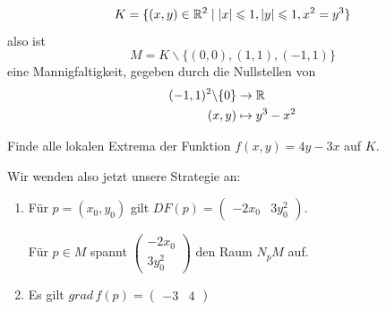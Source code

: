 \documentclass[main.tex]{subfiles}
\begin{document}
\begin{Beispiel}
  $$K = \{(x,y) \in \mathbb{R}^2 \mid |x| \leqslant 1, |y| \leqslant 1, x^2 = y^3\}$$
  also ist
  $$M = K \backslash \{(0,0), (1,1), (-1,1)\}$$ eine Mannigfaltigkeit, gegeben durch die Nullstellen von
  $$\begin{aligned}
    (-1,1)^2 \backslash \{0\} & \to \mathbb{R} \\
    (x,y) & \mapsto y^3 - x^2
  \end{aligned}$$

  \begin{center}
  \end{center}

  Finde alle lokalen Extrema der Funktion $f(x,y) = 4y - 3x$ auf $K$.

  Wir wenden also jetzt unsere Strategie an:
  \begin{enumerate}
    \item Für $p = (x_0,y_0)$ gilt $DF(p) = \begin{pmatrix}
        -2x_0 & 3 y_0^2
      \end{pmatrix}$.

      Für $p \in M$ spannt $\left( \begin{smallmatrix} -2 x_0 \\ 3y_0^2 \end{smallmatrix}\right)$ den Raum $N_p M$ auf.
    \item Es gilt $grad \, f(p) = \begin{pmatrix}
        -3 & 4
      \end{pmatrix}$
  \end{enumerate}


\end{Beispiel}
\end{document}

